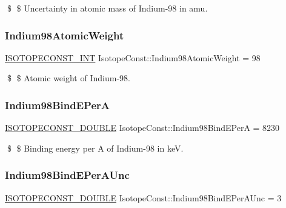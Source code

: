 \$ \$ Uncertainty in atomic mass of Indium-\/98 in amu. \mbox{\label{group___isotope_const-_indium-_in98_ga8f13b6492cde3d5542f4efb9c5ed1f0b}} 
\subsubsection{\texorpdfstring{Indium98\+Atomic\+Weight}{Indium98AtomicWeight}}
{\footnotesize\ttfamily \mbox{\hyperlink{group___isotope_const-_macros_ga5f18360b3e99483a35c32d789e62621c}{I\+S\+O\+T\+O\+P\+E\+C\+O\+N\+S\+T\+\_\+\+I\+NT}} Isotope\+Const\+::\+Indium98\+Atomic\+Weight = 98}

\$ \$ Atomic weight of Indium-\/98. \mbox{\label{group___isotope_const-_indium-_in98_gaa36440f2da08ea5596cdc58a9b6655f8}} 
\subsubsection{\texorpdfstring{Indium98\+Bind\+E\+PerA}{Indium98BindEPerA}}
{\footnotesize\ttfamily \mbox{\hyperlink{group___isotope_const-_macros_ga8f45a7272ce02c0b4c65c44636ed719a}{I\+S\+O\+T\+O\+P\+E\+C\+O\+N\+S\+T\+\_\+\+D\+O\+U\+B\+LE}} Isotope\+Const\+::\+Indium98\+Bind\+E\+PerA = 8230}

\$ \$ Binding energy per A of Indium-\/98 in keV. \mbox{\label{group___isotope_const-_indium-_in98_ga99bce44ef588e628714f2fe0b18f9744}} 
\subsubsection{\texorpdfstring{Indium98\+Bind\+E\+Per\+A\+Unc}{Indium98BindEPerAUnc}}
{\footnotesize\ttfamily \mbox{\hyperlink{group___isotope_const-_macros_ga8f45a7272ce02c0b4c65c44636ed719a}{I\+S\+O\+T\+O\+P\+E\+C\+O\+N\+S\+T\+\_\+\+D\+O\+U\+B\+LE}} Isotope\+Const\+::\+Indium98\+Bind\+E\+Per\+A\+Unc = 3}

